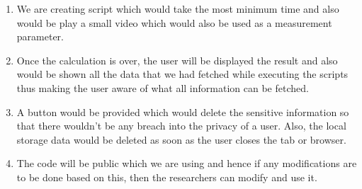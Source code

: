 \documentclass[journal]{IEEEtran}
\begin{document}
\begin{enumerate}
\item We are creating script which would take the most minimum time and also would be play a small video which would also be used as a measurement parameter. 
\item Once the calculation is over, the user will be displayed the result and also would be shown all the data that we had fetched while executing the scripts thus making the user aware of what all information can be fetched. 
\item A button would be provided which would delete the sensitive information so that there wouldn't be any breach into the privacy of a user. Also, the local storage data would be deleted as soon as the user closes the tab or browser. 
\item The code will be public which we are using and hence if any modifications are to be done based on this, then the researchers can modify and use it. 
\end{enumerate}
\end{document}
